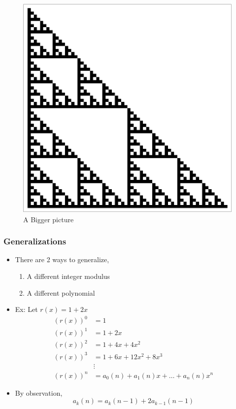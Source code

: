\documentclass{beamer}
\begin{document}
\begin{frame}
    \begin{figure}
        \includegraphics[scale=0.5]{seir.pdf}
        \caption{A Bigger picture}
    \end{figure}
\end{frame}

\begin{frame}
    \frametitle{Generalizations}
    \begin{itemize}
        \item There are 2 ways to generalize,
        \begin{enumerate}
            \item A different integer modulus 
            \item A different polynomial
        \end{enumerate}
        \item Ex: Let $r(x) = 1+2x$
        \begin{align*}
            (r(x))^0 &= 1 \\
            (r(x))^1 &= 1+2x \\
            (r(x))^2 &= 1 + 4x + 4x^2\\
            (r(x))^3 &= 1 + 6x + 12x^2 + 8x^3 \\
            &\vdots \\
            (r(x))^n &= a_0(n) + a_1(n)x + \dots + a_n(n)x^n
        \end{align*}
        \item By observation,
        \begin{equation*}
            a_k(n) = a_{k}(n-1) + 2a_{k-1}(n-1)
        \end{equation*}
    \end{itemize}
\end{frame}
\end{document}
